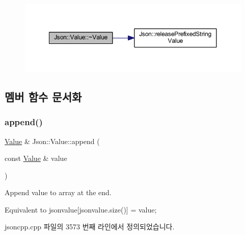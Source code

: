\begin{figure}[H]
\begin{center}
\leavevmode
\includegraphics[width=350pt]{class_json_1_1_value_a287dea48da3912d02756735bf677b27b_cgraph}
\end{center}
\end{figure}


\subsection{멤버 함수 문서화}
\mbox{\label{class_json_1_1_value_a7e49ac977e4bcf59745a09d426669f75}} 
\subsubsection{\texorpdfstring{append()}{append()}}
{\footnotesize\ttfamily \hyperlink{class_json_1_1_value}{Value} \& Json\+::\+Value\+::append (\begin{DoxyParamCaption}\item[{const \hyperlink{class_json_1_1_value}{Value} \&}]{value }\end{DoxyParamCaption})}



Append value to array at the end. 

Equivalent to jsonvalue\mbox{[}jsonvalue.\+size()\mbox{]} = value; 

jsoncpp.\+cpp 파일의 3573 번째 라인에서 정의되었습니다.


